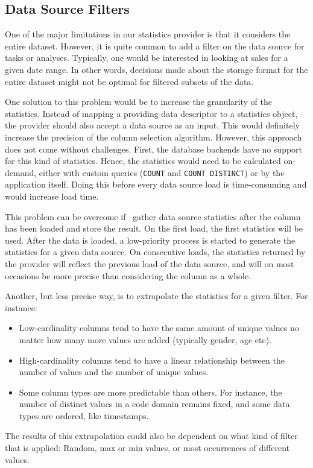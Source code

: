 \subsection{Data Source Filters}
\label{sub:Data Source Filters}
One of the major limitations in our statistics provider is that it considers the entire dataset. However, it is quite common to add a filter on the data source for tasks or analyses. Typically, one would be interested in looking at sales for a given date range. In other words, decisions made about the storage format for the entire dataset might not be optimal for filtered subsets of the data.

One solution to this problem would be to increase the granularity of the statistics. Instead of mapping a providing data descriptor to a statistics object, the provider should also accept a data source as an input. This would definitely increase the precision of the column selection algorithm. However, this approach does not come without challenges. First, the database backends have no support for this kind of statistics. Hence, the statistics would need to be calculated on-demand, either with custom queries (\texttt{COUNT} and \texttt{COUNT DISTINCT}) or by the application itself. Doing this before every data source load is time-consuming and would increase load time. 

This problem can be overcome if \gap~gather data source statistics after the column has been loaded and store the result. On the first load, the first statistics will be used. After the data is loaded, a low-priority process is started to generate the statistics for a given data source. On consecutive loads, the statistics returned by the provider will reflect the previous load of the data source, and will on most occasions be more precise than considering the column as a whole.

Another, but less precise way, is to extrapolate the statistics for a given filter. For instance:
\begin{itemize}
    \item Low-cardinality columns tend to have the same amount of unique values no matter how many more values are added (typically gender, age etc).
    \item High-cardinality columns tend to have a linear relationship between the number of values and the number of unique values.
    \item Some column types are more predictable than others. For instance, the number of distinct values in a code domain remains fixed, and some data types are ordered, like timestamps. 
\end{itemize}
The results of this extrapolation could also be dependent on what kind of filter that is applied: Random, max or min values, or most occurrences of different values.

